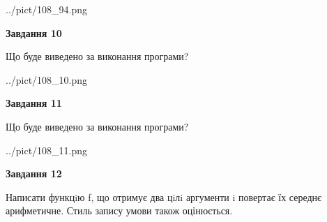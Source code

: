 \documentclass[12pt, ukrainian]{article}
\begin{document}
{\begin {large}
\begin{center}
	{../pict/108_94.png}
\end{center}
\newpage

{\begin {center}\textbf{Завдання 10}\end {center}}

Що буде виведено за виконання програми?\par
\begin{center}
	{../pict/108_10.png}
\end{center}
\newpage

{\begin {center}\textbf{Завдання 11}\end {center}}

Що буде виведено за виконання програми?\par
\begin{center}
	{../pict/108_11.png}
\end{center}
\newpage

{\begin {center}\textbf{Завдання 12}\end {center}}


Написати функцiю f, що отримує два цiлi аргументи i повертає їх середнє арифметичне. Стиль запису умови також оцінюється.\par
\newpage

\end {large}}
\end{document}
